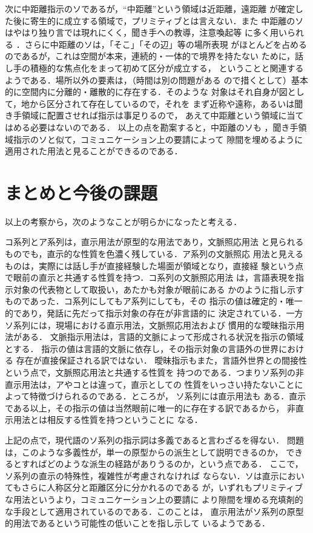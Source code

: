 次に中距離指示のソであるが，``中距離''という領域は近距離，遠距離
が確定した後に寄生的に成立する領域で，プリミティブとは言えない．また
中距離のソはやはり独り言では現れにくく，聞き手への教導，注意喚起等
に多く用いられる
．さらに中距離のソは，「そこ」「その辺」等の場所表現
がほとんどを占めるのであるが，これは空間が本来，連続的・一体的で境界を持たない
ために，話し手の積極的な焦点化をまって初めて区分が成立する，
ということと関連するようである．場所以外の要素は，（時間は別の問題がある
ので措くとして）基本的に空間内に分離的・離散的に存在する．そのような
対象はそれ自身が図として，地から区分されて存在しているので，それを
まず近称や遠称，あるいは聞き手領域に配置させれば指示は事足りるので，
あえて中距離という領域に当てはめる必要はないのである．
以上の点を勘案すると，中距離のソも
，聞き手領域指示のソと似て，コミュニケーション上の要請によって
隙間を埋めるように適用された用法と見ることができるのである．

\section{まとめと今後の課題}
以上の考察から，次のようなことが明らかになったと考える．

コ系列とア系列は，直示用法が原型的な用法であり，文脈照応用法
と見られるものでも，直示的な性質を色濃く残している．ア系列の文脈照応
用法と見えるものは，実際には話し手が直接経験した場面が領域となり，直接経
験という点で眼前の直示と共通する性質を持つ．コ系列の文脈照応用法
は，言語表現を指示対象の代表物として取扱い，あたかも対象が眼前にある
かのように指し示すものであった．コ系列にしてもア系列にしても，その
指示の値は確定的・唯一的であり，発話に先だって指示対象の存在が非言語的に
決定されている．一方ソ系列には，現場における直示用法，文脈照応用法および
慣用的な曖昧指示用法がある．
文脈指示用法は，言語的文脈によって形成される状況を指示の領域とする．
指示の値は言語的文脈に依存し，その指示対象の言語外の世界における
存在が直接保証される訳ではない．
曖昧指示もまた，言語外世界との間接性という点で，文脈照応用法と共通する性質を
持つのである．つまりソ系列の非直示用法は，アやコとは違って，直示としての
性質をいっさい持たないことによって特徴づけられるのである．ところが，
ソ系列には直示用法も
ある．直示である以上，その指示の値は当然眼前に唯一的に存在する訳であるから，
非直示用法とは相反する性質を持つということに
なる．

上記の点で，現代語のソ系列の指示詞は多義であると言わざるを得ない．
問題は，このような多義性が，単一の原型からの派生として説明できるのか，
できるとすればどのような派生の経路がありうるのか，という点である．
ここで，ソ系列の直示の特殊性，複雑性が考慮されなければ
ならない．ソは直示においてもさらに人称区分と距離区分に分かれるのである
が，いずれもプリミティブな用法というより，コミュニケーション上の要請に
より隙間を埋める充填剤的な手段として適用されているのである．このことは，
直示用法がソ系列の原型的用法であるという可能性の低いことを指し示して
いるようである．

